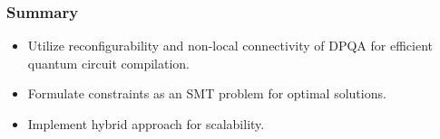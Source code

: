 \documentclass[18 pt]{beamer}
\begin{document}
\begin{frame}
    \frametitle{Summary}
    \begin{itemize}
        \item Utilize reconfigurability and non-local connectivity of DPQA for efficient quantum circuit compilation.
        \item Formulate constraints as an SMT problem for optimal solutions.
        \item Implement hybrid approach for scalability.
    \end{itemize}
\end{frame}


\end{document}
